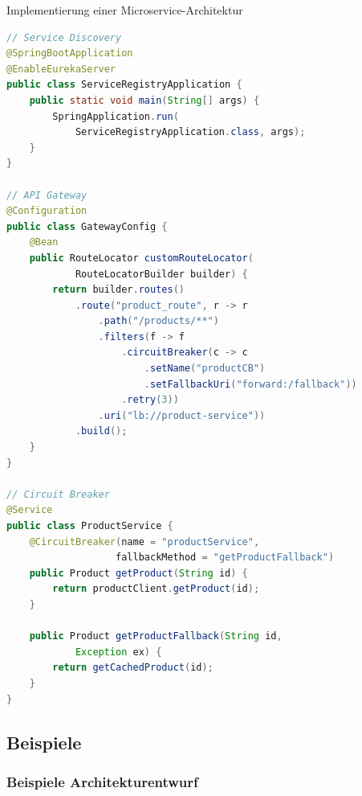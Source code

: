\begin{example2}{Implementierung einer Microservice-Architektur}
\begin{lstlisting}[language=Java, style=basesmol]
// Service Discovery
@SpringBootApplication
@EnableEurekaServer
public class ServiceRegistryApplication {
    public static void main(String[] args) {
        SpringApplication.run(
            ServiceRegistryApplication.class, args);
    }
}

// API Gateway
@Configuration
public class GatewayConfig {
    @Bean
    public RouteLocator customRouteLocator(
            RouteLocatorBuilder builder) {
        return builder.routes()
            .route("product_route", r -> r
                .path("/products/**")
                .filters(f -> f
                    .circuitBreaker(c -> c
                        .setName("productCB")
                        .setFallbackUri("forward:/fallback"))
                    .retry(3))
                .uri("lb://product-service"))
            .build();
    }
}

// Circuit Breaker
@Service
public class ProductService {
    @CircuitBreaker(name = "productService",
                   fallbackMethod = "getProductFallback")
    public Product getProduct(String id) {
        return productClient.getProduct(id);
    }
    
    public Product getProductFallback(String id,
            Exception ex) {
        return getCachedProduct(id);
    }
}
\end{lstlisting}
\end{example2}

\subsection{Beispiele}

\subsubsection{Beispiele Architekturentwurf}

